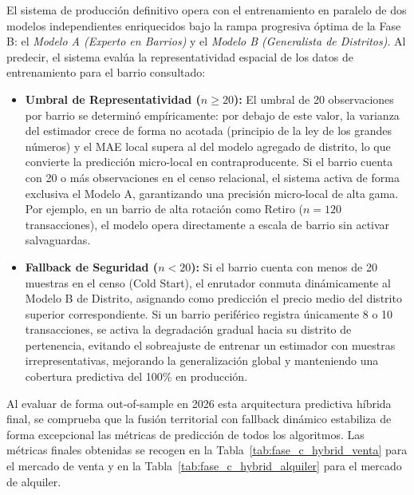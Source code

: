 \documentclass[a4paper,11pt,openany]{book}
\begin{document}
El sistema de producción definitivo opera con el entrenamiento en paralelo de dos modelos independientes enriquecidos bajo la rampa progresiva óptima de la Fase B: el \textit{Modelo A (Experto en Barrios)} y el \textit{Modelo B (Generalista de Distritos)}. Al predecir, el sistema evalúa la representatividad espacial de los datos de entrenamiento para el barrio consultado:
\begin{itemize}
    \item \textbf{Umbral de Representatividad ($n \ge 20$):} El umbral de 20 observaciones por barrio se determinó empíricamente: por debajo de este valor, la varianza del estimador crece de forma no acotada (principio de la ley de los grandes números) y el MAE local supera al del modelo agregado de distrito, lo que convierte la predicción micro-local en contraproducente. Si el barrio cuenta con 20 o más observaciones en el censo relacional, el sistema activa de forma exclusiva el Modelo A, garantizando una precisión micro-local de alta gama. Por ejemplo, en un barrio de alta rotación como Retiro ($n = 120$ transacciones), el modelo opera directamente a escala de barrio sin activar salvaguardas.
    \item \textbf{Fallback de Seguridad ($n < 20$):} Si el barrio cuenta con menos de 20 muestras en el censo (Cold Start), el enrutador conmuta dinámicamente al Modelo B de Distrito, asignando como predicción el precio medio del distrito superior correspondiente. Si un barrio periférico registra únicamente 8 o 10 transacciones, se activa la degradación gradual hacia su distrito de pertenencia, evitando el sobreajuste de entrenar un estimador con muestras irrepresentativas, mejorando la generalización global y manteniendo una cobertura predictiva del 100\% en producción.
\end{itemize}

Al evaluar de forma out-of-sample en 2026 esta arquitectura predictiva híbrida final, se comprueba que la fusión territorial con fallback dinámico estabiliza de forma excepcional las métricas de predicción de todos los algoritmos. Las métricas finales obtenidas se recogen en la Tabla~\ref{tab:fase_c_hybrid_venta} para el mercado de venta y en la Tabla~\ref{tab:fase_c_hybrid_alquiler} para el mercado de alquiler.
\end{document}
